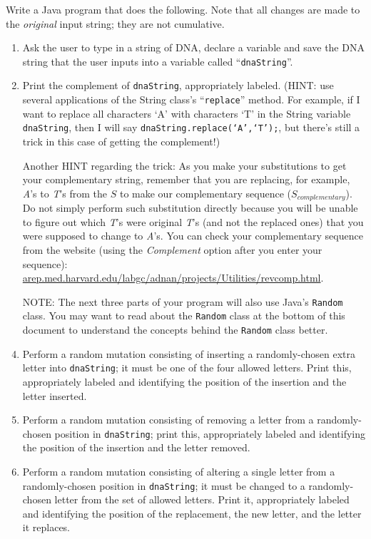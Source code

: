 Write a Java program that does the following.
Note that all changes are made to the {\em original} input string; they
are not cumulative.
\begin{enumerate}
\item
Ask the user to type in a string of DNA, declare a variable and save the DNA string that the user inputs into a variable called ``{\tt dnaString}''.
\item
Print the complement of {\tt dnaString}, appropriately labeled.
(HINT: use several applications of the String class's ``{\tt replace}'' method. For example, if I want to replace all characters `A' with characters `T' in the String variable {\tt dnaString}, then I will say {\tt dnaString.replace(`A',`T');}, but there's still a trick in this case of getting the complement!)

Another HINT regarding the trick: As you make your substitutions to get your complementary string, remember that you are replacing, for example, \emph{A}'s to \emph{T}'s from the $S$ to make our complementary sequence ($S_{complementary}$). Do not simply perform such substitution directly because you will be unable to figure out which \emph{T}'s were original \emph{T}'s (and not the replaced ones) that you were supposed to change to \emph{A}'s. You can check your complementary sequence from the website  (using the \emph{Complement} option after you enter your sequence): \url{arep.med.harvard.edu/labgc/adnan/projects/Utilities/revcomp.html}.

\item[NOTE:]
The next three parts of your program will also use Java's {\tt Random} class. You may want to read about the {\tt Random} class at the bottom of this document to understand the concepts behind the {\tt Random} class better.
\item
Perform a random mutation consisting of inserting a randomly-chosen
extra letter into {\tt dnaString}; it
must be one of the four allowed letters. Print this, appropriately labeled
and identifying the position of the insertion and the letter inserted.
\item
Perform a random mutation consisting of removing a letter from a
randomly-chosen position in {\tt dnaString}; print this, appropriately labeled
and identifying the position of the insertion and the letter removed.
\item
Perform a random mutation consisting of altering a single letter from a
randomly-chosen position in {\tt dnaString}; it must be changed to a
randomly-chosen letter from the set of allowed letters. Print it, appropriately
labeled
and identifying the position of the replacement, the new letter, and the
letter it replaces.
\end{enumerate}


